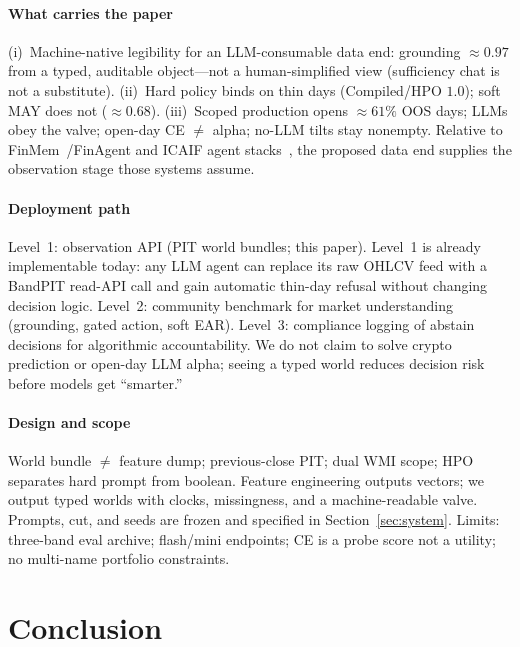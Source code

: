 \documentclass[sigconf,anonymous]{acmart}
\theoremstyle{acmdefinition}%
\theoremstyle{acmplain}%
\begin{document}
\paragraph{What carries the paper}
(i)~Machine-native legibility for an LLM-consumable data end: grounding \({\approx}0.97\) from a typed, auditable object---not a human-simplified view (sufficiency chat is not a substitute).
(ii)~Hard policy binds on thin days (Compiled/HPO \(1.0\)); soft MAY does not (\({\approx}0.68\)).
(iii)~Scoped production opens \({\approx}61\%\) OOS days; LLMs obey the valve; open-day CE \(\neq\) alpha; no-LLM tilts stay nonempty.
Relative to FinMem~/FinAgent and ICAIF agent stacks~\cite{yu2023finmem,zhang2024finagent,choi2025finagentbench,shen2025finsearch,sun2025finresearchbench,duan2025factormad}, the proposed data end supplies the observation stage those systems assume.

\paragraph{Deployment path}
Level~1: observation API (PIT world bundles; this paper).
Level~1 is already implementable today: any LLM agent can replace its raw OHLCV feed with a BandPIT read-API call and gain automatic thin-day refusal without changing decision logic.
Level~2: community benchmark for market understanding (grounding, gated action, soft EAR).
Level~3: compliance logging of abstain decisions for algorithmic accountability.
We do not claim to solve crypto prediction or open-day LLM alpha; seeing a typed world reduces decision risk before models get ``smarter.''

\paragraph{Design and scope}
World bundle \(\neq\) feature dump; previous-close PIT; dual WMI scope; HPO separates hard prompt from boolean.
Feature engineering outputs vectors; we output typed worlds with clocks, missingness, and a machine-readable valve.
Prompts, cut, and seeds are frozen and specified in Section~\ref{sec:system}.
Limits: three-band eval archive; flash/mini endpoints; CE is a probe score not a utility; no multi-name portfolio constraints.

\balance
\section{Conclusion}
\label{sec:conc}
\end{document}
